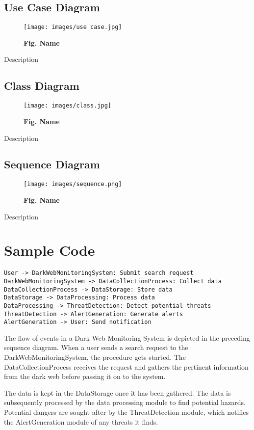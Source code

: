 \documentclass[10pt]{report}
\begin{document}
\subsection{Use Case Diagram}
\begin{figure}[H]
 \centering
 \texttt{[image: images/use case.jpg]}
 \caption{\textbf{Fig. Name}}
\end{figure}
Description
\subsection{Class Diagram}
\begin{figure}[H]
 \centering
 \texttt{[image: images/class.jpg]}
 \caption{\textbf{Fig. Name}}
\end{figure}
Description
\subsection{Sequence Diagram}
\begin{figure}[H]
 \centering
 \texttt{[image: images/sequence.png]}
 \caption{\textbf{Fig. Name}}
\end{figure}
Description

\section{Sample Code}
\begin{lstlisting}
User -> DarkWebMonitoringSystem: Submit search request
DarkWebMonitoringSystem -> DataCollectionProcess: Collect data
DataCollectionProcess -> DataStorage: Store data
DataStorage -> DataProcessing: Process data
DataProcessing -> ThreatDetection: Detect potential threats
ThreatDetection -> AlertGeneration: Generate alerts
AlertGeneration -> User: Send notification

\end{lstlisting}

The flow of events in a Dark Web Monitoring System is depicted in the preceding sequence diagram. When a user sends a search request to the DarkWebMonitoringSystem, the procedure gets started. The DataCollectionProcess receives the request and gathers the pertinent information from the dark web before passing it on to the system.

The data is kept in the DataStorage once it has been gathered. The data is subsequently processed by the data processing module to find potential hazards. Potential dangers are sought after by the ThreatDetection module, which notifies the AlertGeneration module of any threats it finds.
\end{document}
